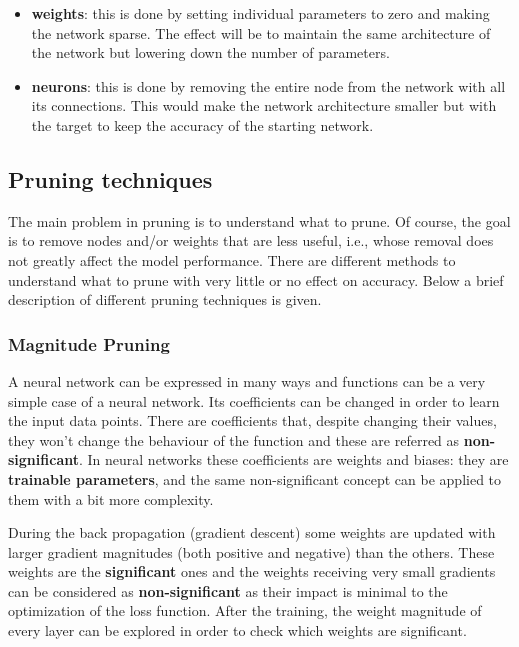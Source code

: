 \begin{itemize}
    \item \textbf{weights}: this is done by setting individual parameters to
        zero and making the network sparse. The effect will be to maintain the
        same architecture of the network but lowering down the number of
        parameters.
    \item \textbf{neurons}: this is done by removing the entire node from the
        network with all its connections. This would make the network
        architecture smaller but with the target to keep the accuracy of the
        starting network.
\end{itemize}

\subsection{Pruning techniques}
The main problem in pruning is to understand what to prune. Of course, the goal
is to remove nodes and/or weights that are less useful, i.e., whose removal
does not greatly affect the model performance. There are different methods to
understand what to prune with very little or no effect on accuracy.
Below a brief description of different pruning techniques is given.

\subsubsection{Magnitude Pruning}
A neural network can be expressed in many ways and functions can be a very
simple case of a neural network. Its coefficients can be changed in order to
learn the input data points.
There are coefficients that, despite changing their values, they won't change
the behaviour of the function and these are referred as
\textbf{non-significant}.
In neural networks these coefficients are weights and biases: they are
\textbf{trainable parameters}, and the same non-significant concept can be
applied to them with a bit more complexity.

During the back propagation (gradient descent) some weights are updated with
larger gradient magnitudes (both positive and negative) than the others.
These weights are the \textbf{significant} ones and the weights receiving very
small gradients can be considered as \textbf{non-significant} as their impact
is minimal to the optimization of the loss function.
After the training, the weight magnitude of every layer can be explored in
order to check which weights are significant.

